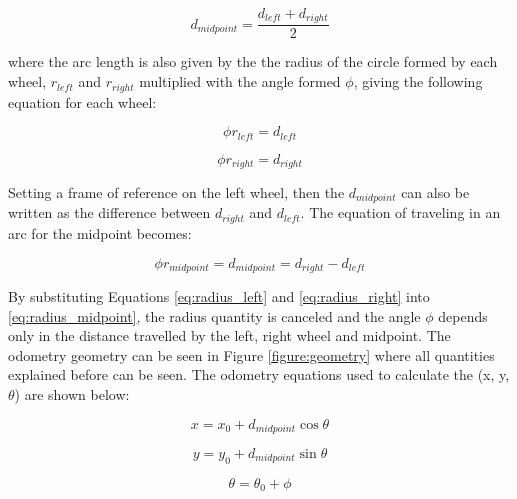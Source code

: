 \begin{equation}
    d_{midpoint} = \frac{d_{left} + d_{right}}{2}
\end{equation}

where the arc length is also given by the the radius of the circle formed by each wheel, $r_{left}$ and $r_{right}$ multiplied with the angle formed $\phi$, giving the following equation for each wheel:

\begin{equation}
    \phi r_{left} = d_{left} 
\label{eq:radius_left}
\end{equation}

\begin{equation}
    \phi r_{right} = d_{right}
\label{eq:radius_right}
\end{equation}

Setting a frame of reference on the left wheel, then the $d_{midpoint}$ can also be written as the difference between $d_{right}$ and $d_{left}$. The equation of traveling in an arc for the midpoint becomes:

\begin{equation}
    \phi r_{midpoint} = d_{midpoint} =  d_{right} - d_{left}
\label{eq:radius_midpoint}
\end{equation}

By substituting Equations \ref{eq:radius_left} and \ref{eq:radius_right} into \ref{eq:radius_midpoint}, the radius quantity is canceled and the angle $\phi$ depends only in the distance travelled by the left, right wheel and midpoint. The odometry geometry can be seen in Figure \ref{figure:geometry} where all quantities explained before can be seen. The odometry equations used to calculate the (x, y, $\theta$) are shown below:


\begin{equation}
    x = x_0 + d_{midpoint}\cos{\theta}
\end{equation}

\begin{equation}
    y = y_0 + d_{midpoint}\sin{\theta}
\end{equation}

\begin{equation}
    \theta = \theta_0 + \phi
\label{eq:theta}
\end{equation}

